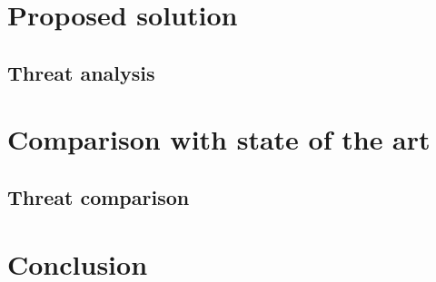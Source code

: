 \documentclass[12pt]{article}
\begin{document}
\newpage

\section{Proposed solution}
\label{sec:Proposed solution}

\subsection{Threat analysis}
\label{sub:Threat analysis}

\newpage

\section{Comparison with state of the art}
\label{sec:Comparison with state of the art}

\subsection{Threat comparison}
\label{sub:Threat comparison}

\section{Conclusion}
\label{sec:Conclusion}

\newpage


\nocite{*}

\end{document}
